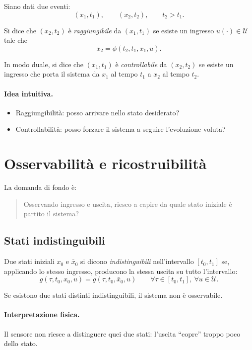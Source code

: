 Siano dati due eventi:
\[
(x_1,t_1),\qquad (x_2,t_2),\qquad t_2>t_1.
\]

Si dice che $(x_2,t_2)$ è \emph{raggiungibile} da $(x_1,t_1)$ se esiste un ingresso $u(\cdot)\in\mathcal{U}$ tale che
\[
x_2=\phi(t_2,t_1,x_1,u).
\]

In modo duale, si dice che $(x_1,t_1)$ è \emph{controllabile} da $(x_2,t_2)$ se esiste un ingresso che porta il sistema da $x_1$ al tempo $t_1$ a $x_2$ al tempo $t_2$.

\paragraph{Idea intuitiva.}
\begin{itemize}
    \item Raggiungibilità: posso arrivare nello stato desiderato?
    \item Controllabilità: posso forzare il sistema a seguire l'evoluzione voluta?
\end{itemize}

\section{Osservabilità e ricostruibilità}

La domanda di fondo è:

\begin{quote}
Osservando ingresso e uscita, riesco a capire da quale stato iniziale è partito il sistema?
\end{quote}

\subsection{Stati indistinguibili}

Due stati iniziali $x_0$ e $\bar x_0$ si dicono \emph{indistinguibili} nell'intervallo $[t_0,t_1]$ se, applicando lo stesso ingresso, producono la stessa uscita su tutto l'intervallo:
\[
g(\tau,t_0,x_0,u)=g(\tau,t_0,\bar x_0,u)
\qquad
\forall \tau\in [t_0,t_1],\ \forall u\in\mathcal U.
\]

Se esistono due stati distinti indistinguibili, il sistema non è osservabile.

\paragraph{Interpretazione fisica.}
Il sensore non riesce a distinguere quei due stati: l'uscita ``copre'' troppo poco dello stato.

